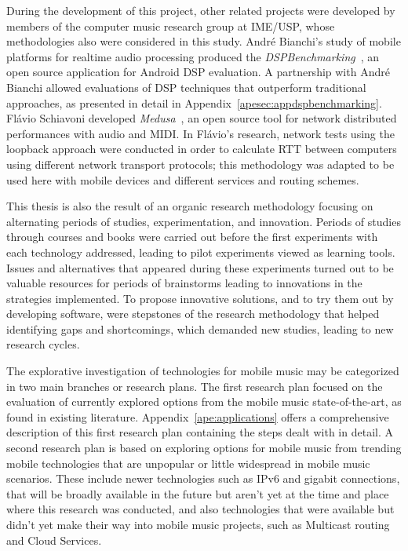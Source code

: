 During the development of this project, other related projects were developed by members of the computer music research group at IME/USP, whose methodologies also were considered in this study.
André Bianchi's study of mobile platforms for realtime audio processing produced the \textit{DSPBenchmarking}~\citep{Bianchi2012ontheperformance}, an open source application for Android DSP evaluation.
A partnership with André Bianchi allowed evaluations of DSP techniques that outperform traditional approaches, as presented in detail in Appendix~\ref{apesec:appdspbenchmarking}.
Flávio Schiavoni developed \textit{Medusa}~\citep{Schiavoni2011medusa}, an open source tool for network distributed performances with audio and MIDI.
In Flávio's research, network tests using the loopback approach were conducted in order to calculate RTT between computers using different network transport protocols; this methodology was adapted to be used here with mobile devices and different services and routing schemes.

This thesis is also the result of an organic research methodology focusing on alternating periods of studies, experimentation, and innovation.
Periods of studies through courses and books were carried out before the first experiments with each technology addressed, leading to pilot experiments viewed as learning tools.
Issues and alternatives that appeared during these experiments turned out to be valuable resources for periods of brainstorms leading to innovations in the strategies implemented.
To propose innovative solutions, and to try them out by developing software, were stepstones of the research methodology that helped identifying gaps and shortcomings, which demanded new studies, leading to new research cycles.

The explorative investigation of technologies for mobile music may be categorized in two main branches or research plans.
The first research plan focused on the evaluation of currently explored options from the mobile music state-of-the-art, as found in existing literature.
Appendix~\ref{ape:applications} offers a comprehensive description of this first research plan containing the steps dealt with in detail.
A second research plan is based on exploring options for mobile music from trending mobile technologies that are unpopular or little widespread in mobile music scenarios. 
These include newer technologies such as IPv6 and gigabit connections, that will be broadly available in the future but aren't yet at the time and place where this research was conducted, and also technologies that were available but didn't yet make their way into mobile music projects, such as Multicast routing and Cloud Services.

